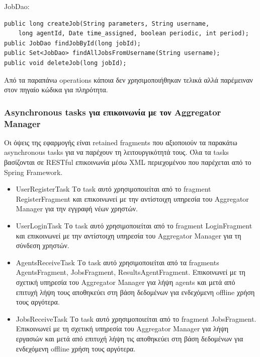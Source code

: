 \documentclass[a4paper,11pt]{article}
\begin{document}
\begin{sloppypar}
\begin{itemize}
\begin{lstlisting}
\end{lstlisting}

JobDao:

\begin{lstlisting}
public long createJob(String parameters, String username,
    long agentId, Date time_assigned, boolean periodic, int period);
public JobDao findJobById(long jobId);
public Set<JobDao> findAllJobsFromUsername(String username);
public void deleteJob(long jobId);
\end{lstlisting}

Από τα παραπάνω operations κάποια δεν χρησιμοποιήθηκαν τελικά αλλά παρέμειναν στον πηγαίο κώδικα για πληρότητα.

\newpage

\subsubsection{Asynchronous tasks για επικοινωνία με τον Aggregator Manager}

Οι όψεις της εφαρμογής είναι retained fragments που αξιοποιούν τα παρακάτω asynchronous tasks για να παρέχουν τη λειτουργικότητά τους. Όλα τα tasks βασίζονται σε RESTful επικοινωνία μέσω XML περιεχομένου που παρέχεται από το Spring Framework.

\begin{itemize}

\item UserRegisterTask
\newline
Το task αυτό χρησιμοποιείται από το fragment RegisterFragment και επικοινωνεί με την αντίστοιχη υπηρεσία του Aggregator Manager για την εγγραφή νέων χρηστών.

\item UserLoginTask
\newline
Το task αυτό χρησιμοποιείται από το fragment LoginFragment και επικοινωνεί με την αντίστοιχη υπηρεσία του Aggregator Manager για τη σύνδεση χρηστών.

\item AgentsReceiveTask
\newline
Το task αυτό χρησιμοποιείται από τα fragments AgentsFragment, JobsFragment, ResultsAgentFragment. Επικοινωνεί με τη σχετική υπηρεσία του Aggregator Manager για λήψη agents και μετά από επιτυχή λήψη τους αποθηκεύει στη βάση δεδομένων για ενδεχόμενη offline χρήση τους αργότερα.

\item JobsReceiveTask
\newline
Το task αυτό χρησιμοποιείται από το fragment JobsFragment. Επικοινωνεί με τη σχετική υπηρεσία του Aggregator Manager για λήψη εργασιών και μετά από επιτυχή λήψη τις αποθηκεύει στη βάση δεδομένων για ενδεχόμενη offline χρήση τους αργότερα.


\end{itemize}
\end{itemize}
\end{sloppypar}
\end{document}
